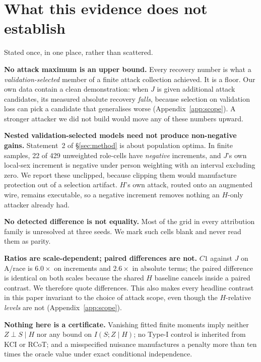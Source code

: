 \documentclass[10pt]{article}
\begin{document}
\begin{table}[t]
\centering\scriptsize

\caption{Study~5 cells. \noteStudyFivePending}
\label{tab:s5pending}
\end{table}

\section{What this evidence does not establish}
\label{sec:limits}

Stated once, in one place, rather than scattered.

\textbf{No attack maximum is an upper bound.} Every recovery number is what a
\emph{validation-selected} member of a finite attack collection achieved. It is a floor. Our own data
contain a clean demonstration: when $J$ is given additional attack candidates, its measured absolute
recovery \emph{falls}, because selection on validation loss can pick a candidate that generalises
worse (Appendix~\ref{app:scope}). A stronger attacker we did not build would move any of these numbers
upward.

\textbf{Nested validation-selected models need not produce non-negative gains.} Statement~2 of
\S\ref{sec:method} is about population optima. In finite samples, 22 of 429 unweighted role-cells
have \emph{negative} increments, and $J$'s own local-sex increment is negative under person weighting
with an interval excluding zero. We report these unclipped, because clipping them would manufacture
protection out of a selection artifact. $H$'s own attack, routed onto an augmented wire, remains
executable, so a negative increment removes nothing an $H$-only attacker already had.

\textbf{No detected difference is not equality.} Most of the grid in every attribution family is
unresolved at three seeds. We mark such cells blank and never read them as parity.

\textbf{Ratios are scale-dependent; paired differences are not.} $C1$ against $J$ on A/race is
$6.0\times$ on increments and $2.6\times$ in absolute terms; the paired difference is identical on
both scales because the shared $H$ baseline cancels inside a paired contrast. We therefore quote
differences. This also makes every headline contrast in this paper invariant to the choice of attack
scope, even though the $H$-relative \emph{levels} are not (Appendix~\ref{app:scope}).

\textbf{Nothing here is a certificate.} Vanishing fitted finite moments imply neither $Z\perp S\mid H$
nor any bound on $I(S;Z\mid H)$; no Type-I control is inherited from KCI or RCoT; and a misspecified
nuisance manufactures a penalty more than ten times the oracle value under exact conditional
independence.
\end{document}
